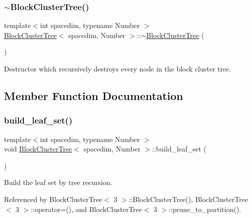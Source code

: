 \subsubsection{\texorpdfstring{$\sim$\+Block\+Cluster\+Tree()}{~BlockClusterTree()}}
{\footnotesize\ttfamily template$<$int spacedim, typename Number $>$ \\
\hyperlink{classBlockClusterTree}{Block\+Cluster\+Tree}$<$ spacedim, Number $>$\+::$\sim$\hyperlink{classBlockClusterTree}{Block\+Cluster\+Tree} (\begin{DoxyParamCaption}{ }\end{DoxyParamCaption})}

Destructor which recursively destroys every node in the block cluster tree. 

\subsection{Member Function Documentation}
\mbox{\label{classBlockClusterTree_a1b3396fbedf6ec07cce9c23a62b2c30b}} 
\subsubsection{\texorpdfstring{build\+\_\+leaf\+\_\+set()}{build\_leaf\_set()}}
{\footnotesize\ttfamily template$<$int spacedim, typename Number $>$ \\
void \hyperlink{classBlockClusterTree}{Block\+Cluster\+Tree}$<$ spacedim, Number $>$\+::build\+\_\+leaf\+\_\+set (\begin{DoxyParamCaption}{ }\end{DoxyParamCaption})}

Build the leaf set by tree recursion. 

Referenced by Block\+Cluster\+Tree$<$ 3 $>$\+::\+Block\+Cluster\+Tree(), Block\+Cluster\+Tree$<$ 3 $>$\+::operator=(), and Block\+Cluster\+Tree$<$ 3 $>$\+::prune\+\_\+to\+\_\+partition().

\mbox{\label{classBlockClusterTree_a7f9dbea25751771830c72d09efacacb2}} 
